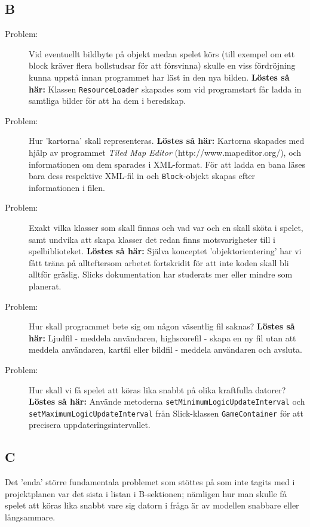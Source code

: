 \documentclass[11pt,a4paper]{article}
\begin{document}
\subsection{B}
\begin{description}
	\item[Problem:] Vid eventuellt bildbyte på objekt medan spelet körs (till exempel om ett block kräver flera bollstudsar för att försvinna) skulle en viss fördröjning kunna uppstå innan programmet har läst in den nya bilden. \textbf{Löstes så här:} Klassen \texttt{ResourceLoader} skapades som vid programstart får ladda in samtliga bilder för att ha dem i beredskap.
	\item[Problem:] Hur 'kartorna' skall representeras. \textbf{Löstes så här:} Kartorna skapades med hjälp av programmet \emph{Tiled Map Editor} (http://www.mapeditor.org/), och informationen om dem sparades i XML-format. För att ladda en bana läses bara dess respektive XML-fil in och \texttt{Block}-objekt skapas efter informationen i filen.
	\item[Problem:] Exakt vilka klasser som skall finnas och vad var och en skall sköta i spelet, samt undvika att skapa klasser det redan finns motsvarigheter till i spelbiblioteket. \textbf{Löstes så här:} Själva konceptet 'objektorientering' har vi fått träna på allteftersom arbetet fortskridit för att inte koden skall bli alltför gräslig. Slicks dokumentation har studerats mer eller mindre som planerat.
	\item[Problem:] Hur skall programmet bete sig om någon väsentlig fil saknas? \textbf{Löstes så här:} Ljudfil - meddela användaren, highscorefil - skapa en ny fil utan att meddela användaren, kartfil eller bildfil - meddela användaren och avsluta.
	\item[Problem:] Hur skall vi få spelet att köras lika snabbt på olika kraftfulla datorer? \textbf{Löstes så här:} Använde metoderna \texttt{setMinimumLogicUpdateInterval} och \texttt{setMaximumLogicUpdateInterval} från Slick-klassen \texttt{GameContainer} för att precisera uppdateringsintervallet.
\end{description}

\subsection{C}
Det 'enda' större fundamentala problemet som stöttes på som inte tagits med i projektplanen var det sista i listan i B-sektionen; nämligen hur man skulle få spelet att köras lika snabbt vare sig datorn i fråga är av modellen snabbare eller långsammare.
\end{document}
